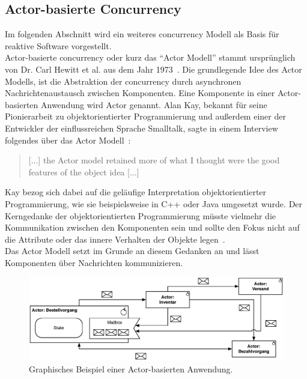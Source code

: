 \subsection{Actor-basierte Concurrency}\label{subsec:actor-model}
Im folgenden Abschnitt wird ein weiteres \gls{concurrency} Modell als Basis für reaktive Software vorgestellt.\\
Actor-basierte \gls{concurrency} oder kurz das \enquote{Actor Modell} stammt ursprünglich von Dr. Carl Hewitt et al. aus dem Jahr 1973~\cite{hewitt_universal_1973}. Die grundlegende Idee des Actor Modells, ist die Abstraktion der \gls{concurrency} durch asynchronen Nachrichtenaustausch zwischen Komponenten. Eine Komponente in einer Actor-basierten Anwendung wird Actor genannt. Alan Kay, bekannt für seine Pionierarbeit zu objektorientierter Programmierung und außerdem einer der Entwickler der einflussreichen Sprache Smalltalk, sagte in einem Interview folgendes über das Actor Modell~\cite{binstock_interview_2012}:

\begin{quotation}
[...] the Actor model retained more of what I thought were the good features of the object idea [...]
\end{quotation}

Kay bezog sich dabei auf die geläufige Interpretation objektorientierter Programmierung, wie sie beispielsweise in C++ oder Java umgesetzt wurde. Der Kerngedanke der objektorientierten Programmierung müsste vielmehr die Kommunikation zwischen den Komponenten sein und sollte den Fokus nicht auf die Attribute oder das innere Verhalten der Objekte legen~\cite[S.~10]{vernon_reactive_2016}.\\
Das Actor Modell setzt im Grunde an diesem Gedanken an und lässt Komponenten über Nachrichten kommunizieren. 

\begin{figure}[H]
 \centering
 \includegraphics[width=1.0\textwidth]{4-Hauptteil/actor-model/actor-model.eps}
 \caption{Graphisches Beispiel einer Actor-basierten Anwendung.}
 \label{fig:actor-model}
\end{figure}


